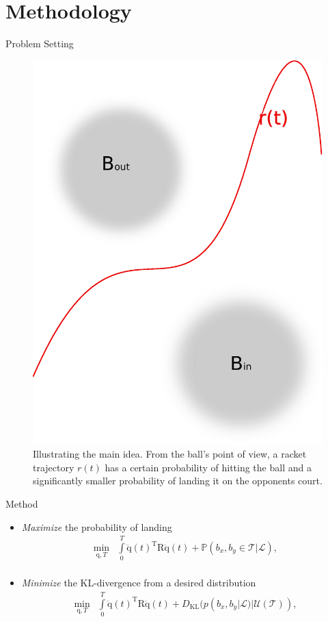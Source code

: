 \documentclass[handout]{beamer}
\newcommand{\boldvec}[1]{\boldsymbol{\mathrm{#1}}}
\let\vec\boldvec
\newcommand{\joint}{\vec{q}} %
\newcommand{\court}{\mathcal{T}} %
\newcommand{\prob}{\mathbb{P}} %
\newcommand{\landEvent}{\mathcal{L}} %
\newcommand{\KL}{D_{\mathrm{KL}}}
\begin{document}
\section{Methodology}
%
\begin{frame}{Problem Setting}
\begin{figure}[t!]
\centering
\includegraphics[scale=0.3]{drawingBallsEye.eps}			
\caption{Illustrating the main idea. From the ball's point of view, a racket trajectory $r(t)$ has a certain probability of hitting the ball and a significantly smaller probability of landing it on the opponents court.}
\label{mainIdea2}
\end{figure}
\end{frame}
%
\begin{frame}{Method}
\begin{itemize}
\item \emph{Maximize} the probability of landing
%
\begin{align}
\min_{\joint,T} & \int\limits_{0}^{T}\ddot{\joint}(t)^{\mathrm{T}}\vec{R}\ddot{\joint}(t) + \prob(b_x,b_y \in \court|\landEvent), \\
\label{costFnc1}
\end{align}
%
\item \emph{Minimize} the KL-divergence from a desired distribution
%
\begin{align}
\min_{\joint,T} & \int\limits_{0}^{T}\ddot{\joint}(t)^{\mathrm{T}}\vec{R}\ddot{\joint}(t) + \KL(p(b_x,b_y|\landEvent)|\mathcal{U}(\court)), \\
\label{costFnc2}
\end{align}
\end{itemize}
\end{frame}
\end{document}
